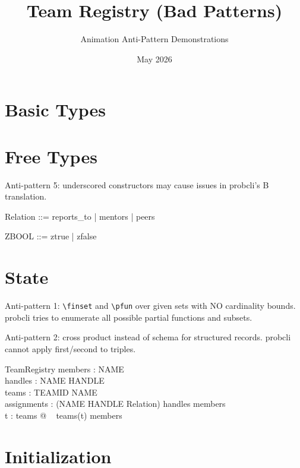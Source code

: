 \documentclass[a4paper,10pt,fleqn]{article}
\begin{document}
\title{Team Registry (Bad Patterns)}
\author{Animation Anti-Pattern Demonstrations}
\date{May 2026}
\maketitle

\section{Basic Types}

\begin{zed}
\end{zed}

\section{Free Types}

Anti-pattern 5: underscored constructors may cause issues
in probcli's B translation.

\begin{zed}
  Relation ::= reports\_to | mentors | peers
\end{zed}

\begin{zed}
  ZBOOL ::= ztrue | zfalse
\end{zed}

\section{State}

Anti-pattern 1: \verb|\finset| and \verb|\pfun| over given sets
with NO cardinality bounds. probcli tries to enumerate all
possible partial functions and subsets.

Anti-pattern 2: cross product instead of schema for structured
records. probcli cannot apply first/second to triples.

\begin{schema}{TeamRegistry}
  members : \finset NAME \\
  handles : NAME \pfun HANDLE \\
  teams : TEAMID \pfun \finset NAME \\
  assignments : \finset (NAME \cross HANDLE \cross Relation)
\where
  \dom handles \subseteq members \\
  \forall t : \dom teams @
\quad~ teams(t) \subseteq members
\end{schema}

\section{Initialization}
\end{document}
